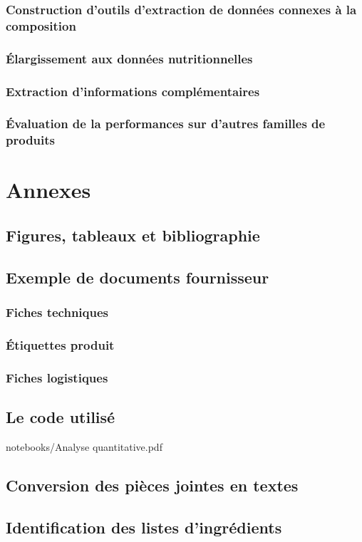 \documentclass{report}
\begin{document}
        \section{Construction d'outils d'extraction de données connexes à la composition}
        \section{\'{E}largissement aux données nutritionnelles}
        \section{Extraction d'informations complémentaires}
        \section{\'{E}valuation de la performances sur d'autres familles de produits}


\appendix
\part{Annexes}
    \chapter{Figures, tableaux et bibliographie}
        \listoftables
        \listoffigures
        
         
    \chapter{Exemple de documents fournisseur}
        \section{Fiches techniques}
        \section{\'{E}tiquettes produit}
        \section{Fiches logistiques}
    \chapter{Le code utilisé}
        
                    {notebooks/Analyse quantitative.pdf}
    \chapter{Conversion des pièces jointes en textes}
    \chapter{Identification des listes d'ingrédients}
\end{document}
